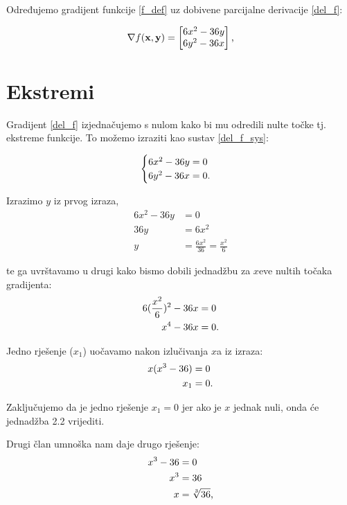 Određujemo gradijent funkcije \eqref{f_def} uz dobivene parcijalne derivacije \eqref{del_f}:

\begin{equation}
    \nabla f(\mathbf{x}, \mathbf{y}) = \begin{bmatrix}
        6x^2 - 36y \\
        6y^2 - 36x
    \end{bmatrix}\textnormal{,}
\end{equation}

\section{Ekstremi}

Gradijent \eqref{del_f} izjednačujemo s nulom kako bi mu odredili nulte točke tj. ekstreme funkcije.
To možemo izraziti kao sustav \eqref{del_f_sys}:

$$
\begin{cases}
    6x^2 - 36y = 0 \\
    6y^2 - 36x = 0 \textnormal{.}
\end{cases}
$$

Izrazimo $y$ iz prvog izraza,
\begin{align*}
    6x^2 - 36y &= 0 \\
    36y & = 6x^2 \\
    y & = \frac{6x^2}{36} = \frac{x^2}{6}
\end{align*}

te ga uvrštavamo u drugi kako bismo dobili jednadžbu za $x$eve nultih točaka gradijenta:
\begin{align}
    6(\frac{x^2}{6})^2 - 36x & = 0 \nonumber \\
    x^4 - 36x & = 0 \textnormal{.}
\end{align}

Jedno rješenje ($x_1$) uočavamo nakon izlučivanja $x$a iz izraza:
\begin{align*}
    x(x^3 - 36) &= 0 \\
    x_1 &= 0 \textnormal{.}
\end{align*}

Zaključujemo da je jedno rješenje $x_1 = 0$ jer ako je $x$ jednak nuli, onda će jednadžba 2.2 vrijediti. \par

Drugi član umnoška nam daje drugo rješenje:
\begin{align*}
    x^3 - 36 &= 0 \\
    x^3 &= 36 \\
    x &= \sqrt[3]{36} \textnormal{,}
\end{align*}

